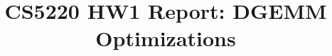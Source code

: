 \documentclass{cbxnsf}
\begin{document}

\title{CS5220 HW1 Report: DGEMM Optimizations}


\makedescriptiontitle
\vspace{0.1in}








\end{document}
